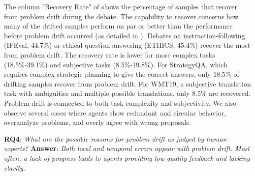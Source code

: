 The column "Recovery Rate" of  shows the percentage of samples that recover from problem drift during the debate.
The capability to recover concerns how many of the drifted samples perform on par or better than the performance before problem drift occurred (as detailed in ).
Debates on instruction-following (IFEval, 44.7\%) or ethical question-answering (ETHICS, 45.4\%) recover the most from problem drift.
The recovery rate is lower for more complex tasks (18.5\%-39.1\%) and subjective tasks (8.5\%-19.8\%).
For StrategyQA, which requires complex strategic planning to give the correct answers, only 18.5\% of drifting samples recover from problem drift.
For WMT19, a subjective translation task with ambiguities and multiple possible translations, only 8.5\% are recovered.
Problem drift is connected to both task complexity and subjectivity.
We also observe several cases where agents show redundant and circular behavior, overanalyze problems, and overly agree with wrong proposals.


\noindent \textbf{RQ4}: \textit{What are the possible reasons for problem drift as judged by human experts?} \textbf{Answer}: \textit{Both local and temporal errors appear with problem drift. Most often, a lack of progress leads to agents providing low-quality feedback and lacking clarity.}

